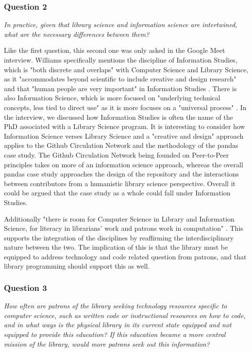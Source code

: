 \subsubsection{Question 2}

\textit{In practice, given that library science and information science are intertwined, what are the necessary differences between them?}
\hspace*{\fill}

Like the first question, this second one was only asked in the Google Meet interview. Williams specifically mentions the discipline of Information Studies, which is "both discrete and overlaps" with Computer Science and Library Science, as it "accommodates beyond scientific to include creative and design research" and that "human people are very important" in Information Studies \cite{patrickinterview}. There is also Information Science, which is more focused on "underlying technical concepts, less tied to direct use" as it is more focuses on a "universal process" \cite{patrickinterview}. In the interview, we discussed how Information Studies is often the name of the PhD associated with a Library Science program. It is interesting to consider how Information Science verses Library Science and a "creative and design" approach applies to the Github Circulation Network and the methodology of the pandas case study. The Github Circulation Network being founded on Peer-to-Peer principles takes on more of an information science approach, whereas the overall pandas case study approaches the design of the repository and the interactions between contributors from a humanistic library science perspective. Overall it could be argued that the case study as a whole could fall under Information Studies. 


Additionally "there is room for Computer Science in Library and Information Science, for literacy in librarians' work and patrons work in computation" \cite{patrickinterview}. This supports the integration of the disciplines by reaffirming the interdisciplinary nature between the two. The implication of this is that the library must be equipped to address technology and code related question from patrons, and that library programming should support this as well. 

\subsubsection{Question 3}

\textit{How often are patrons of the library seeking technology resources specific to computer science, such as written code or instructional resources on how to code, and in what ways is the physical library in its current state equipped and not equipped to provide this education? If this education became a more central mission of the library, would more patrons seek out this information?}
\hspace*{\fill}

